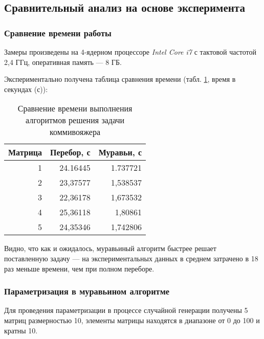 \documentclass[a4paper,12pt]{article}
\begin{document}
\subsection{Сравнительный анализ на основе эксперимента}

\subsubsection{Сравнение времени работы}

Замеры произведены на 4-ядерном процессоре \textit{Intel Core i7}
с тактовой частотой 2,4 ГГц, оперативная память --- 8 ГБ.

Экспериментально получена таблица сравнения времени 
(табл. \ref{time1}, время в секундах (с)):

\begin{table} [h!]
	\begin{center}
		\caption{Сравнение времени выполнения алгоритмов решения
			задачи коммивояжера}
		\begin{tabular}{|r|r|r|}
			\hline
			Матрица & Перебор, с & Муравьи, с \\
			\hline
			1 &    24.16445 &   1.737721 \\
			\hline
			2 &    23,37577 &   1,538537 \\
			\hline
			3 &    22,36178 &   1,673532 \\
			\hline
			4 &    25,36118 &   1,80861 \\
			\hline
			5 &    24,35346 &   1,742806 \\
			\hline
		\end{tabular} 
		\label{time1}
	\end{center}
\end{table} 

Видно, что как и ожидалось, муравьиный алгоритм быстрее
решает поставленную задачу --- на экспериментальных
данных в среднем затрачено в 18 раз
меньше времени, чем при полном переборе.

\subsubsection{Параметризация в муравьином алгоритме}

Для проведения параметризации в процессе случайной
генерации получены 5 матриц
размерностью 10, элементы матрицы находятся
в диапазоне от 0 до 100 и кратны 10.
\end{document}
